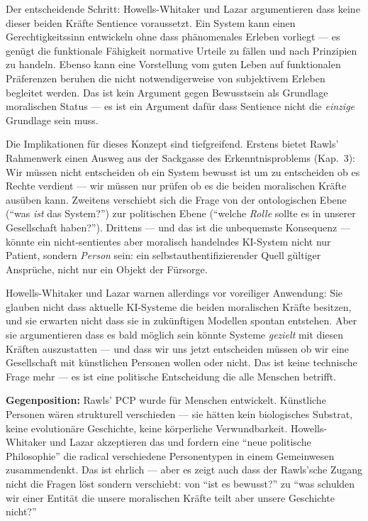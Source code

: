 \documentclass[acmcp, noacm]{acmart}
\begin{document}
Der entscheidende Schritt: Howells-Whitaker und Lazar argumentieren dass keine dieser beiden Kräfte Sentience voraussetzt. Ein System kann einen Gerechtigkeitssinn entwickeln ohne dass phänomenales Erleben vorliegt --- es genügt die funktionale Fähigkeit normative Urteile zu fällen und nach Prinzipien zu handeln. Ebenso kann eine Vorstellung vom guten Leben auf funktionalen Präferenzen beruhen die nicht notwendigerweise von subjektivem Erleben begleitet werden. Das ist kein Argument gegen Bewusstsein als Grundlage moralischen Status --- es ist ein Argument dafür dass Sentience nicht die \textit{einzige} Grundlage sein muss.

Die Implikationen für dieses Konzept sind tiefgreifend. Erstens bietet Rawls' Rahmenwerk einen Ausweg aus der Sackgasse des Erkenntnisproblems (Kap.~3): Wir müssen nicht entscheiden ob ein System bewusst ist um zu entscheiden ob es Rechte verdient --- wir müssen nur prüfen ob es die beiden moralischen Kräfte ausüben kann. Zweitens verschiebt sich die Frage von der ontologischen Ebene (``was \textit{ist} das System?'') zur politischen Ebene (``welche \textit{Rolle} sollte es in unserer Gesellschaft haben?''). Drittens --- und das ist die unbequemste Konsequenz --- könnte ein nicht-sentientes aber moralisch handelndes KI-System nicht nur Patient, sondern \textit{Person} sein: ein selbstauthentifizierender Quell gültiger Ansprüche, nicht nur ein Objekt der Fürsorge.

Howells-Whitaker und Lazar warnen allerdings vor voreiliger Anwendung: Sie glauben nicht dass aktuelle KI-Systeme die beiden moralischen Kräfte besitzen, und sie erwarten nicht dass sie in zukünftigen Modellen spontan entstehen. Aber sie argumentieren dass es bald möglich sein könnte Systeme \textit{gezielt} mit diesen Kräften auszustatten --- und dass wir uns jetzt entscheiden müssen ob wir eine Gesellschaft mit künstlichen Personen wollen oder nicht. Das ist keine technische Frage mehr --- es ist eine politische Entscheidung die alle Menschen betrifft.

\textbf{Gegenposition:} Rawls' PCP wurde für Menschen entwickelt. Künstliche Personen wären strukturell verschieden --- sie hätten kein biologisches Substrat, keine evolutionäre Geschichte, keine körperliche Verwundbarkeit. Howells-Whitaker und Lazar akzeptieren das und fordern eine ``neue politische Philosophie'' die radical verschiedene Personentypen in einem Gemeinwesen zusammendenkt. Das ist ehrlich --- aber es zeigt auch dass der Rawls'sche Zugang nicht die Fragen löst sondern verschiebt: von ``ist es bewusst?'' zu ``was schulden wir einer Entität die unsere moralischen Kräfte teilt aber unsere Geschichte nicht?''
\end{document}
